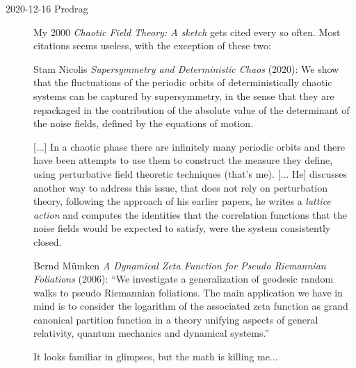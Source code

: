\begin{description}
\item[2020-12-16 Predrag]
My 2000 {\em {Chaotic Field Theory}: {A} sketch} gets cited
every so often. Most citations seems useless, with the exception of these
two:

Stam Nicolis 
{{\em Supersymmetry and Deterministic Chaos}} (2020):
We show that the fluctuations of the periodic orbits of deterministically
chaotic systems can be captured by supersymmetry, in the sense that they
are repackaged in the contribution of the absolute value of the
determinant of the noise fields, defined by the equations of motion.

[...] In a chaotic phase there are infinitely many periodic orbits and
there have been attempts to use them to construct the measure they
define, using perturbative field theoretic techniques (that's me).
[... He]  discusses another way to address this issue, that does not rely
on perturbation theory,
following the approach of his earlier papers, he writes a \emph{lattice action}
and computes the identities that the correlation functions that the
noise fields would be expected to satisfy, were the system consistently
closed.

Bernd M\"umken                                              \toCB
{}
{{\em A Dynamical Zeta Function for Pseudo Riemannian Foliations}}
(2006):
``We investigate a generalization of geodesic random walks to pseudo
Riemannian foliations. The main application we have in mind is to
consider the logarithm of the associated zeta function as grand canonical
partition function in a theory unifying aspects of general relativity,
quantum mechanics and dynamical systems.''

It looks familiar in glimpses, but the math is killing me...



\end{description}

